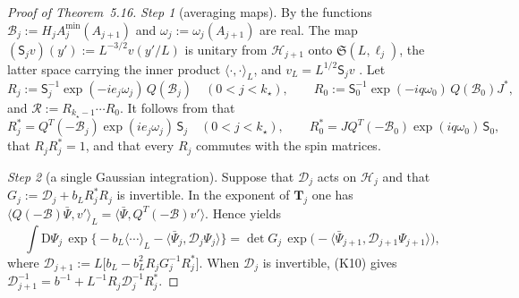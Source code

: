\documentclass[11pt]{amsart}
\theoremstyle{definition}
\begin{document}
\begin{proof}[Proof of Theorem~5.16]
\emph{Step 1} (averaging maps).
By \cite[Propositions~5.31, 5.52\,(i), (iii)]{QEDI} the functions $\mathscr B_j:=H_jA^{\min}_j(A_{j+1})$ and $\omega_j:=\omega_j(A_{j+1})$ are real.
The map $(\mathsf S_jv)(y'):=L^{-3/2}v(y'/L)$ is unitary from $\mathcal H_{j+1}$ onto $\mathfrak S(L,\ell_j)$, the latter space carrying the inner product $\langle\cdot,\cdot\rangle_L$, and $v_L=L^{1/2}\mathsf S_jv$ \cite{QEDIII}.
Let
\begin{equation*}
R_j:=\mathsf S_j^{-1}\exp(-ie_j\omega_j)\,Q(\mathscr B_j)\quad(0<j<k_\star),\qquad R_0:=\mathsf S_0^{-1}\exp(-iq\omega_0)\,Q(\mathscr B_0)J^*,
\end{equation*}
and $\mathcal R:=R_{k_\star-1}\cdots R_0$.
It follows from \cite[(I.J1), (I.J3), (I.Q1), (I.Q2)]{QEDIII} that
\begin{equation*}
R_j^*=Q^T(-\mathscr B_j)\exp(ie_j\omega_j)\,\mathsf S_j\quad(0<j<k_\star),\qquad R_0^*=JQ^T(-\mathscr B_0)\exp(iq\omega_0)\,\mathsf S_0,
\end{equation*}
that $R_jR_j^*=1$, and that every $R_j$ commutes with the spin matrices.

\emph{Step 2} (a single Gaussian integration).
Suppose that $\mathcal D_j$ acts on $\mathcal H_j$ and that $G_j:=\mathcal D_j+b_LR_j^*R_j$ is invertible.
In the exponent of $\mathbf T_j$ \cite{QEDIII} one has $\langle Q(-\mathscr B)\bar\Psi,\allowbreak v'\rangle_L=\allowbreak \langle\bar\Psi,\allowbreak Q^T(-\mathscr B)v'\rangle$.
Hence \cite[Proposition~22.1\,(G2)$^{\mathrm w}$]{QEDIII} yields
\begin{equation*}
\int\mathrm D\Psi_j\,\exp\bigl\{-b_L\langle\cdots\rangle_L-\langle\bar\Psi_j,\mathcal D_j\Psi_j\rangle\bigr\}=\det G_j\,\exp\bigl(-\langle\bar\Psi_{j+1},\mathcal D_{j+1}\Psi_{j+1}\rangle\bigr),
\end{equation*}
where $\mathcal D_{j+1}:=L\bigl[b_L-b_L^2R_jG_j^{-1}R_j^*\bigr]$.
When $\mathcal D_j$ is invertible, (K10) gives $\mathcal D_{j+1}^{-1}=b^{-1}+L^{-1}R_j\mathcal D_j^{-1}R_j^*$.


\end{proof}
\end{document}

